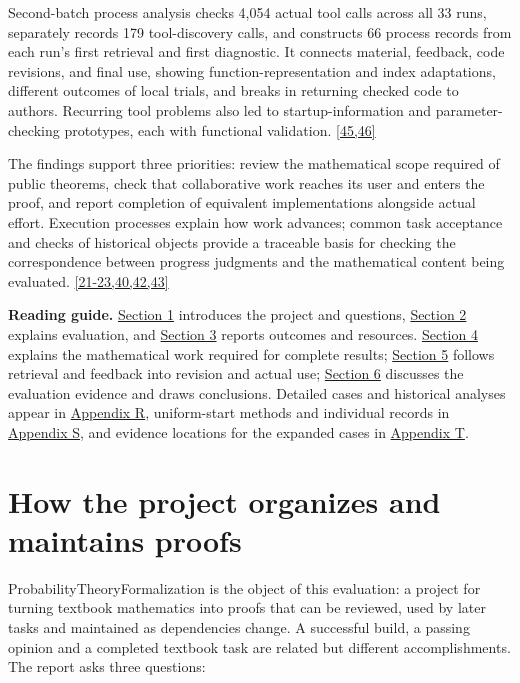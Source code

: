 Second-batch process analysis checks 4,054 actual tool calls across all 33 runs, separately records 179 tool-discovery calls, and constructs 66 process records from each run's first retrieval and first diagnostic. It connects material, feedback, code revisions, and final use, showing function-representation and index adaptations, different outcomes of local trials, and breaks in returning checked code to authors. Recurring tool problems also led to startup-information and parameter-checking prototypes, each with functional validation. \hyperlink{ref-45}{\mbox{[45,46]}}

The findings support three priorities: review the mathematical scope required of public theorems, check that collaborative work reaches its user and enters the proof, and report completion of equivalent implementations alongside actual effort. Execution processes explain how work advances; common task acceptance and checks of historical objects provide a traceable basis for checking the correspondence between progress judgments and the mathematical content being evaluated. \hyperlink{ref-21}{\mbox{[21-23,40,42,43]}}

\textbf{Reading guide.} \hyperlink{section-1}{Section 1} introduces the project and questions, \hyperlink{section-2}{Section 2} explains evaluation, and \hyperlink{section-3}{Section 3} reports outcomes and resources. \hyperlink{section-4}{Section 4} explains the mathematical work required for complete results; \hyperlink{section-5}{Section 5} follows retrieval and feedback into revision and actual use; \hyperlink{section-6}{Section 6} discusses the evaluation evidence and draws conclusions. Detailed cases and historical analyses appear in \href{en-appendix.pdf\#appendix-r}{Appendix R}, uniform-start methods and individual records in \href{en-appendix.pdf\#appendix-s}{Appendix S}, and evidence locations for the expanded cases in \href{en-appendix.pdf\#appendix-t}{Appendix T}.

\section[How the project organizes and maintains proofs]{\texorpdfstring{\protect\hypertarget{section-1}{}How the project organizes and maintains proofs}{How the project organizes and maintains proofs}}
\hypertarget{evaluation-questions}{}

ProbabilityTheoryFormalization is the object of this evaluation: a project for turning textbook mathematics into proofs that can be reviewed, used by later tasks and maintained as dependencies change. A successful build, a passing opinion and a completed textbook task are related but different accomplishments. The report asks three questions:

